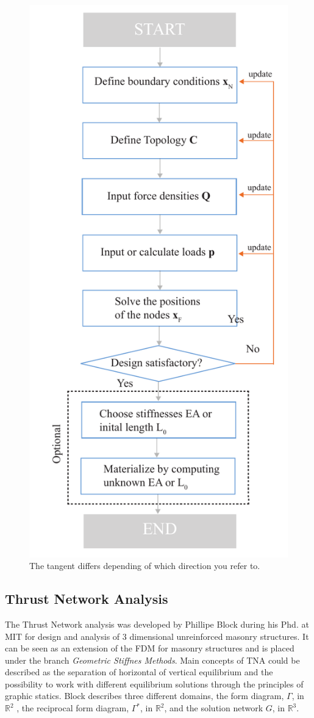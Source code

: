 \begin{figure}[H]
\centering
\includegraphics[width=0.6\linewidth ]{figure/Theory/FDScheme2.pdf}
\caption{The tangent differs depending of which direction you refer to. }
\end{figure}


\subsection{Thrust Network Analysis}

The Thrust Network analysis was developed by Phillipe Block during his Phd. at MIT for design and analysis of  3 dimensional unreinforced masonry structures. It can be seen as an extension of the FDM for masonry structures and is placed under the branch \textit{Geometric Stiffnes Methods}. Main concepts of TNA could be described as the separation of horizontal of vertical equilibrium and the possibility to work with different equilibrium solutions through the principles of graphic statics. Block describes three different domains, the form diagram, $\Gamma$, in $\mathbb{R}^2$  , the reciprocal form diagram, $\Gamma^*$, in $\mathbb{R}^2$,  and the solution network $G$, in $\mathbb{R}^3$.

